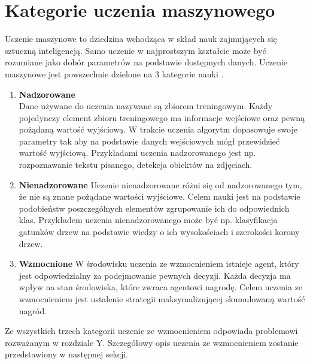 \documentclass[12pt]{book}
\begin{document}
\section{Kategorie uczenia maszynowego}
Uczenie maszynowe to dziedzina wchodząca w skład nauk zajmujących się sztuczną inteligencją. Samo uczenie w najprostszym kształcie może być rozumiane jako dobór parametrów na podstawie dostępnych danych. Uczenie maszynowe jest powszechnie dzielone na 3 kategorie nauki \cite{machineLearningClassification}.
\begin{enumerate}
\item \textbf{Nadzorowane} \\
Dane używane do uczenia nazywane są zbiorem treningowym. Każdy pojedynczy element zbioru treningowego ma informacje wejściowe oraz pewną pożądaną wartość wyjściową. W trakcie uczenia algorytm dopasowuje swoje parametry tak aby na podstawie danych wejściowych mógł przewidzieć wartość wyjściową. Przykładami uczenia nadzorowanego jest np. rozpoznawanie tekstu pisanego, detekcja obiektów na zdjęciach.
\item \textbf{Nienadzorowane}
Uczenie nienadzorowane różni się od nadzorowanego tym, że nie  są znane pożądane wartości wyjściowe. Celem nauki jest na podstawie podobieństw poszczególnych elementów zgrupowanie ich do odpowiednich klas. Przykładem uczenia nienadzorowanego może być np. klasyfikacja gatunków drzew na podstawie wiedzy o ich wysokościach i szerokości korony drzew.
\item \textbf{Wzmocnione}
W środowisku uczenia ze wzmocnieniem istnieje agent, który jest odpowiedzialny za podejmowanie pewnych decyzji. Każda decyzja ma wpływ na stan środowiska, które zwraca agentowi nagrodę. Celem uczenia ze wzmocnieniem jest ustalenie strategii maksymalizującej skumulowaną wartość nagród.
\end{enumerate}
Ze wszystkich trzech kategorii uczenie ze wzmocnieniem odpowiada problemowi rozważanym w rozdziale Y. Szczegółowy opis uczenia ze wzmocnieniem zostanie przedstawiony w następnej sekcji.
\end{document}
